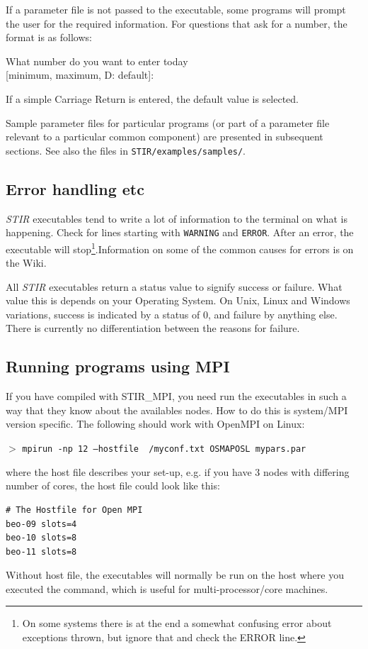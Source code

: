 \documentclass{article}
\newcommand{\tab}{\hspace{5mm}}
\newcommand{\cmdline}[1]{\par \noindent $>$ \texttt{#1}\par}
\begin{document}
If a parameter file is not passed to the executable, some
programs will prompt the user 
for the required information. For questions that 
ask for a number, the format is as follows:


\tab What number do you want to enter today \\
\tab [minimum, maximum, D: default]:


If a simple Carriage Return is entered, the default value is 
selected.


Sample parameter files for particular programs (or part of a 
parameter file relevant to a particular common component) are 
presented in subsequent sections. See also the files in \texttt{STIR/examples/samples/}.


\subsection{
Error handling etc}
\textit{STIR} executables tend to write a lot of information to the terminal on what is happening.
Check for lines starting with \texttt{WARNING} and \texttt{ERROR}. 
After an error, the executable will stop\footnote{On some systems there is at the end
a somewhat confusing error about
exceptions thrown, but ignore that and check the ERROR line.}.Information on some of the common
causes for errors is on the Wiki.

All \textit{STIR} executables return a status value to signify success 
or failure. What value this is depends on your Operating System. 
On Unix, Linux and Windows variations, success is indicated by 
a status of 0, and failure by anything else. There is currently 
no differentiation between the reasons for failure.

\subsection{
Running programs using MPI \label{sec:RunningWithMPI}}
If you have compiled with STIR\_MPI, you need run the executables in such a way that
they know about the availables nodes. How to do this is system/MPI version specific. The following
should work with OpenMPI on Linux:

\cmdline{mpirun -np 12 --hostfile ~/myconf.txt OSMAPOSL mypars.par}

\noindent 
where the host file describes your set-up, e.g. if you have 3 nodes with differing number of cores, the
host file could look like this:
\begin{verbatim}
# The Hostfile for Open MPI
beo-09 slots=4
beo-10 slots=8
beo-11 slots=8
\end{verbatim}
Without host file, the executables will normally be run on the host where you executed the command, which
is useful for multi-processor/core machines. 
\end{document}
